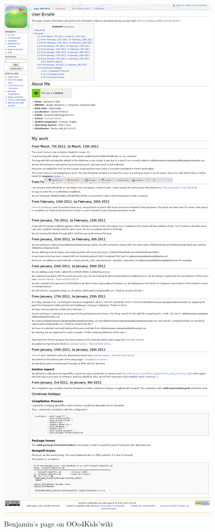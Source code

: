 \documentclass[a4paper,11pt]{article}
\begin{document}
\begin{figure}[h!]
    \centering
	\includegraphics[scale=0.2]{images/OOo4Kids_bvialle.png}
	\caption{Benjamin's page on OOo4Kids'wiki}
\end{figure}
\end{document}
